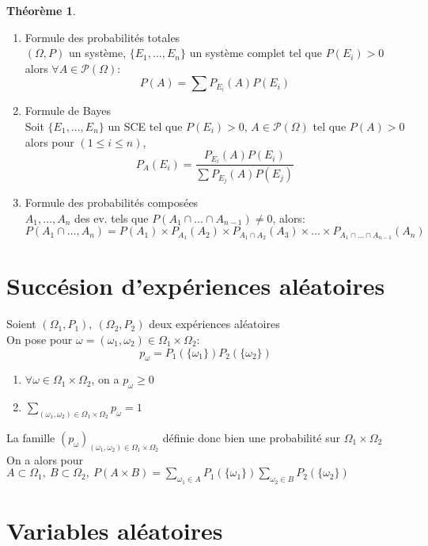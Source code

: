 \documentclass[fleqn]{article}
\theoremstyle{definition} \newtheorem*{defi}{D\'efinition}
\theoremstyle{definition} \newtheorem*{theo}{Th\'eor\`eme}
\theoremstyle{definition} \newtheorem*{coro}{Corollaire}
\theoremstyle{remark} \newtheorem*{rqs}{Remarques}
\theoremstyle{definition} \newtheorem*{prop}{Propri\'et\'e}
\begin{document}
\begin{theo} $ $
	\begin{enumerate}
		\item Formule des probabilit\'es totales\\
			$(\Omega, P)$ un syst\`eme, $\{E_1, \hdots, E_n\}$ un syst\`eme complet tel que $P(E_i) > 0$ alors $\forall A \in
			\mathcal{P}(\Omega):$ \[P(A) = \sum P_{E_i}(A)P(E_i)\]
		\item Formule de Bayes\\
			Soit $\{E_1, \hdots, E_n\}$ un SCE tel que $P(E_i) > 0$, $A \in \mathcal{P}(\Omega)$ tel que $P(A) > 0$ alors pour $(1 \leq i
			\leq n)$, \[P_A(E_i) = \frac{P_{E_i}(A) P(E_i)}{\sum P_{E_j}(A) P(E_j)}\]
		\item Formule des probabilit\'es compos\'ees\\
			$A_1, \hdots, A_n$ des ev. tels que $P(A_1 \cap \hdots \cap A_{n-1}) \neq 0$, alors:
			\[P(A_1 \cap \hdots, A_n) = P(A_1) \times P_{A_1}(A_2) \times P_{A_1 \cap A_2}(A_3) \times \hdots \times
			P_{A_1 \cap \hdots \cap A_{n-1}}(A_n)\]
	\end{enumerate}
\end{theo}

\section{Succ\'esion d'exp\'eriences al\'eatoires}
Soient $(\Omega_1, P_1),\ (\Omega_2, P_2)$ deux exp\'eriences al\'eatoires\\ On pose pour $\omega = (\omega_1, \omega_2) \in \Omega_1 \times
\Omega_2$: \[p_\omega = P_1(\{\omega_1\})P_2(\{\omega_2\})\]

\begin{enumerate}
	\item $\forall \omega \in \Omega_1 \times \Omega_2$, on a $p_\omega \geq 0$
	\item $\sum_{(\omega_1, \omega_2) \in \Omega_1 \times \Omega_2} p_\omega = 1$
\end{enumerate}
La famille $(p_\omega)_{(\omega_1, \omega_2) \in \Omega_1 \times \Omega_2}$ d\'efinie donc bien une probabilit\'e sur $\Omega_1 \times \Omega_2$\\
On a alors pour $A \subset \Omega_1,\ B \subset \Omega_2,\ P(A \times B) = \sum_{\omega_1 \in A} P_1(\{\omega_1\}) \sum_{\omega_2 \in B}
P_2(\{\omega_2\})$

\section{Variables al\'eatoires}
\end{document}
